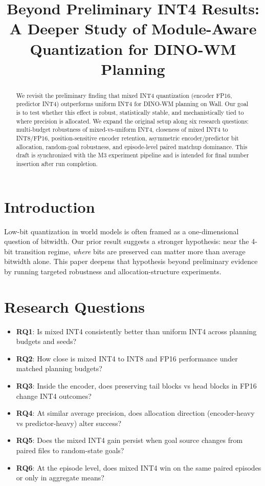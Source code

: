 \documentclass{article}
\title{Beyond Preliminary INT4 Results: A Deeper Study of Module-Aware Quantization for DINO-WM Planning}
\author{}
\begin{document}
\maketitle
{}

\begin{abstract}
We revisit the preliminary finding that mixed INT4 quantization (encoder FP16, predictor INT4) outperforms uniform INT4 for DINO-WM planning on Wall.
Our goal is to test whether this effect is robust, statistically stable, and mechanistically tied to where precision is allocated.
We expand the original setup along six research questions: multi-budget robustness of mixed-vs-uniform INT4, closeness of mixed INT4 to INT8/FP16, position-sensitive encoder retention, asymmetric encoder/predictor bit allocation, random-goal robustness, and episode-level paired matchup dominance.
This draft is synchronized with the M3 experiment pipeline and is intended for final number insertion after run completion.
\end{abstract}

\section{Introduction}
Low-bit quantization in world models is often framed as a one-dimensional question of bitwidth.
Our prior result suggests a stronger hypothesis: near the 4-bit transition regime, \emph{where} bits are preserved can matter more than average bitwidth alone.
This paper deepens that hypothesis beyond preliminary evidence by running targeted robustness and allocation-structure experiments.

\section{Research Questions}
\begin{itemize}
  \item \textbf{RQ1}: Is mixed INT4 consistently better than uniform INT4 across planning budgets and seeds?
  \item \textbf{RQ2}: How close is mixed INT4 to INT8 and FP16 performance under matched planning budgets?
  \item \textbf{RQ3}: Inside the encoder, does preserving tail blocks vs head blocks in FP16 change INT4 outcomes?
  \item \textbf{RQ4}: At similar average precision, does allocation direction (encoder-heavy vs predictor-heavy) alter success?
  \item \textbf{RQ5}: Does the mixed INT4 gain persist when goal source changes from paired files to random-state goals?
  \item \textbf{RQ6}: At the episode level, does mixed INT4 win on the same paired episodes or only in aggregate means?
\end{itemize}
\end{document}
